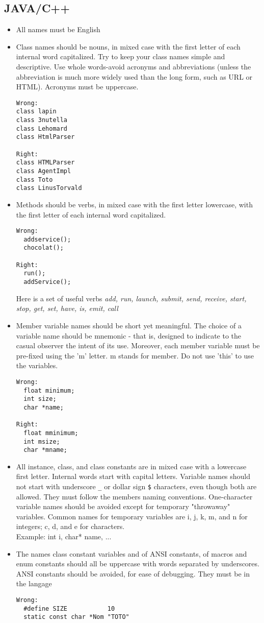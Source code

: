 \documentclass{article}
\begin{document}
\subsection{JAVA/C++}
\begin{itemize}
\item All names must be English
\item Class names should be nouns, in mixed case with the first letter of each
 internal word capitalized. Try to keep your class names simple and descriptive.
 Use whole words-avoid acronyms and abbreviations (unless the abbreviation is
 much more widely used than the long form, such as URL or HTML). Acronyms must
be uppercase.
\begin{verbatim}
Wrong:
class lapin
class 3nutella
class Lehomard
class HtmlParser

Right:
class HTMLParser
class AgentImpl
class Toto
class LinusTorvald
\end{verbatim}

\item Methods should be verbs, in mixed case with the first letter lowercase,
 with the first letter of each internal word capitalized.
\begin{verbatim}
Wrong:
  addservice();
  chocolat();

Right:
  run();
  addService();
\end{verbatim}
Here is a set of useful verbs \textit{add, run, launch, submit, send, receive,
start, stop, get, set, have, is, emit, call}
\item Member variable names should be short yet meaningful. The choice of a
 variable name should be mnemonic - that is, designed to indicate to the
 casual observer the intent of its use. Moreover, each member
 variable must be pre-fixed using the 'm' letter. m stands for member. 
 Do not use 'this' to use the variables.

\begin{verbatim}
Wrong:
  float minimum;
  int size;
  char *name;

Right:
  float mminimum;
  int msize;
  char *mname;
\end{verbatim}
\item All instance, class, and class constants are in mixed case with a
 lowercase first letter. Internal words start with capital letters. Variable
 names should not start with underscore \texttt{\_} or dollar sign \texttt{\$}
 characters, even though both are allowed. They must follow the members naming
 conventions.
One-character variable names should be avoided except for temporary "throwaway"
 variables. Common names for temporary variables are i, j, k, m, and n for
 integers; c, d, and e for characters.\\
  Example: int i, char* name, ...
\item The names class constant variables and of ANSI constants,
 of macros and enum constants should all be uppercase with words
 separated by underscores. ANSI constants should be avoided, for ease of
 debugging. They must be in the langage
\begin{verbatim}
Wrong:
  #define SIZE           10
  static const char *Nom "TOTO"


\end{verbatim}
\end{itemize}
\end{document}
